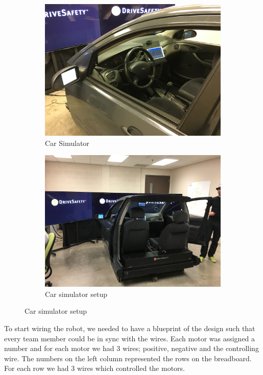\documentclass[index=totoc,hyperref,openany]{labbook} %
\begin{document}
\begin{figure}[H] %
\begin{subfigure}{.5\textwidth}
  \centering
  \includegraphics[width=.65\linewidth]{simulator_car}
  \caption{Car Simulator}
  \label{fig:simulator_car}
\end{subfigure}%
\begin{subfigure}{.5\textwidth}
  \centering
  \includegraphics[width=.65\linewidth]{simulator_setup}
  \caption{Car simulator setup}
  \label{fig:simulator_setup}
\end{subfigure}
\label{fig:servo_motors}
\end{figure}


{\let\clearpage\relax {}}

To start wiring the robot, we needed to have a blueprint of the design such that every team member could be in sync with the wires. Each motor was assigned a number and for each motor we had 3 wires; positive, negative and the controlling wire. The numbers on the left column represented the rows on the breadboard. For each row we had 3 wires which controlled the motors.
\end{document}

